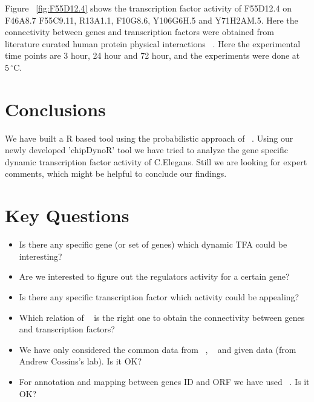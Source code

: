 \documentclass[12pt]{article}
\begin{document}
      
Figure ~\ref{fig:F55D12.4} shows the transcription factor activity of F55D12.4 on F46A8.7
F55C9.11, R13A1.1, F10G8.6, Y106G6H.5 and Y71H2AM.5. Here the connectivity between genes
and transcription factors were obtained from literature curated human protein 
physical interactions ~\cite{wormnet:url}. Here the experimental time points are 
3 hour, 24 hour and 72 hour, and the experiments were done at $5\,^{\circ}\mathrm{C}$.


\section{Conclusions}\label{conclusions}

We have built a R based tool using the probabilistic approach of ~\cite{sanguinetti:01}. Using our  
newly developed 'chipDynoR' tool we have tried to analyze the gene specific dynamic transcription 
factor activity of C.Elegans. Still we are looking for expert comments, which might be helpful
to conclude our findings.

\section{Key Questions}\label{keyQuestions}

\begin{itemize}
	\item Is there any specific gene (or set of genes) which dynamic TFA could be interesting?
	\item Are we interested to figure out the regulators activity for a certain gene?
	\item Is there any specific transcription factor which activity could be appealing?
	\item Which relation of ~\cite{wormnet:url} is the right one to obtain the connectivity
	      between genes and transcription factors?
	\item We have only considered the common data from ~\cite{wormnet:url}, ~\cite{edgedb:01} 
	      and given data (from Andrew Cossins's lab). Is it OK? 
	\item For annotation and mapping between genes ID and ORF we have used ~\cite{celegans:db}.
	      Is it OK?
\end{itemize}	      


%
%



\end{document}
